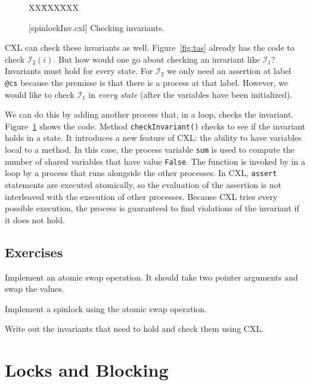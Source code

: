\documentclass{report}
\newcommand{\cxlsource}[1]{
\begin{tabbing}
XX\=XXX\=XXX\kill
    
\end{tabbing}
}
\newenvironment{code}{
\tcolorbox
}{
\endtcolorbox
}
\begin{document}
\begin{figure}
\begin{code}
\cxlsource{spinlockInv}
\end{code}
\caption{[spinlockInv.cxl] Checking invariants.}
\label{fig:tasinv}
\end{figure}

CXL can check these invariants as well.  Figure~\ref{fig:tas} already
has the code to check $\mathcal{I}_2(i)$.  But how would one go about checking an
invariant like $\mathcal{I}_1$?  Invariants must hold for every state.
For $\mathcal{I}_2$ we only need an assertion at label \texttt{@cs} because the
premisse is that there is a process at that label.  However, we would
like to check $\mathcal{I}_1$ in \emph{every state} (after the variables have
been initialized).

We can do this by adding another process that, in a loop,
checks the invariant.  Figure~\ref{fig:tasinv} shows the code.
Method \texttt{checkInvariant()} checks to see if the invariant holds
in a state.  It introduces a new feature of CXL: the ability to have
variables local to a method.  In this case, the process variable \texttt{sum}
is used to compute the number of shared variables that have value
\texttt{False}.
The function is invoked by in a loop by a process that runs alongside
the other processes.
In CXL, \texttt{assert} statements are executed atomically, so the
evaluation of the assertion is not interleaved with the execution
of other processes.
Because CXL tries every possible execution, the process is guaranteed
to find violations of the invariant if it does not hold.

\section*{Exercises}
\begin{problems}
\item Implement an atomic swap operation.  It should take two pointer arguments
and swap the values.
\item Implement a spinlock using the atomic swap operation.
\item Write out the invariants that need to hold and check them using CXL.
\end{problems}

\chapter{Locks and Blocking}
\label{ch:synch}
\end{document}
